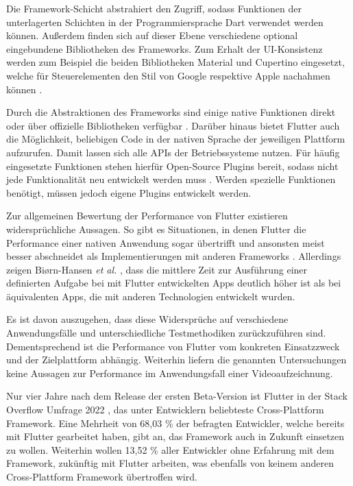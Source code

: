 Die Framework-Schicht abstrahiert den Zugriff, sodass Funktionen der unterlagerten Schichten in der Programmiersprache Dart verwendet werden können.
Außerdem finden sich auf dieser Ebene verschiedene optional eingebundene Bibliotheken des Frameworks.
Zum Erhalt der \ac{UI}-Konsistenz werden zum Beispiel die beiden Bibliotheken Material und Cupertino eingesetzt, welche für Steuerelementen den Stil von Google respektive Apple nachahmen können \cite{Manchanda_CrossPlatformFrameworks, Flutter_Architektur}.


Durch die Abstraktionen des Frameworks sind einige native Funktionen direkt oder über offizielle Bibliotheken verfügbar \cite{Dart_Overview}.
Darüber hinaus bietet Flutter auch die Möglichkeit, beliebigen Code in der nativen Sprache der jeweiligen Plattform aufzurufen.
Damit lassen sich alle \acp{API} der Betriebssysteme nutzen.
Für häufig eingesetzte Funktionen stehen hierfür Open-Source Plugins bereit, sodass nicht jede Funktionalität neu entwickelt werden muss \cite{Flutter_Architektur}.
Werden spezielle Funktionen benötigt, müssen jedoch eigene Plugins entwickelt werden.


Zur allgemeinen Bewertung der Performance von Flutter existieren widersprüchliche Aussagen.
So gibt es Situationen, in denen Flutter die Performance einer nativen Anwendung sogar übertrifft und ansonsten meist besser abschneidet als Implementierungen mit anderen Frameworks \cite{Nawrocki_Comparison_Hybrid_Native_Frameworks}.
Allerdings zeigen Bi{\o}rn-Hansen \textit{et al.} \cite{Biorn-Hansen_PerformanceOverhead_CrossPlatform}, dass die mittlere Zeit zur Ausführung einer definierten Aufgabe bei mit Flutter entwickelten Apps deutlich höher ist als bei äquivalenten Apps, die mit anderen Technologien entwickelt wurden.

Es ist davon auszugehen, dass diese Widersprüche auf verschiedene Anwendungsfälle und unterschiedliche Testmethodiken zurückzuführen sind.
Dementsprechend ist die Performance von Flutter vom konkreten Einsatzzweck und der Zielplattform abhängig.
Weiterhin liefern die genannten Untersuchungen keine Aussagen zur Performance im Anwendungsfall einer Videoaufzeichnung.

Nur vier Jahre nach dem Release der ersten Beta-Version \cite{Sharma_Flutter} ist Flutter in der Stack Overflow Umfrage 2022 \cite{Stackoverflow_2022}, das unter Entwicklern beliebteste Cross-Plattform Framework.
Eine Mehrheit von 68,03 \% der befragten Entwickler, welche bereits mit Flutter gearbeitet haben, gibt an, das Framework auch in Zukunft einsetzen zu wollen.
Weiterhin wollen 13,52 \% aller Entwickler ohne Erfahrung mit dem Framework, zukünftig mit Flutter arbeiten, was ebenfalls von keinem anderen Cross-Plattform Framework übertroffen wird.

